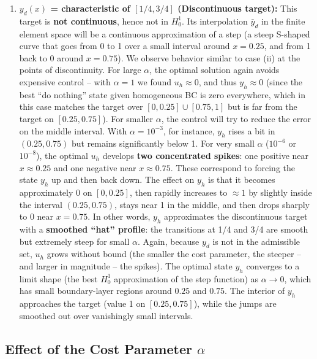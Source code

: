 \documentclass[a4paper,10pt]{report}
\begin{document}
\begin{enumerate}
	\item \textbf{\(y_d(x)\) = characteristic of \([1/4,3/4]\) (Discontinuous target):} This target is \textbf{not continuous}, hence not in \(H^1_0\). Its interpolation \(\bar y_d\) in the finite element space will be a continuous approximation of a step (a steep S-shaped curve that goes from 0 to 1 over a small interval around \(x=0.25\), and from 1 back to 0 around \(x=0.75\)). We observe behavior similar to case (ii) at the points of discontinuity. For large \(\alpha\), the optimal solution again avoids expensive control – with \(\alpha=1\) we found \(u_h\approx 0\), and thus \(y_h\approx 0\) (since the best “do nothing” state given homogeneous BC is zero everywhere, which in this case matches the target over \([0,0.25]\cup[0.75,1]\) but is far from the target on \([0.25,0.75]\)). For smaller \(\alpha\), the control will try to reduce the error on the middle interval. With \(\alpha=10^{-3}\), for instance, \(y_h\) rises a bit in \((0.25,0.75)\) but remains significantly below 1. For very small \(\alpha\) (\(10^{-6}\) or \(10^{-8}\)), the optimal \(u_h\) develops \textbf{two concentrated spikes}: one positive near \(x\approx 0.25\) and one negative near \(x\approx 0.75\). These correspond to forcing the state \(y_h\) up and then back down. The effect on \(y_h\) is that it becomes approximately 0 on \([0,0.25]\), then rapidly increases to \(\approx 1\) by slightly inside the interval \((0.25,0.75)\), stays near 1 in the middle, and then drops sharply to 0 near \(x=0.75\). In other words, \(y_h\) approximates the discontinuous target with a \textbf{smoothed “hat” profile}: the transitions at 1/4 and 3/4 are smooth but extremely steep for small \(\alpha\). Again, because \(y_d\) is not in the admissible set, \(u_h\) grows without bound (the smaller the cost parameter, the steeper – and larger in magnitude – the spikes). The optimal state \(y_h\) converges to a limit shape (the best \(H^1_0\) approximation of the step function) as \(\alpha\to 0\), which has small boundary-layer regions around \(0.25\) and \(0.75\). The interior of \(y_h\) approaches the target (value 1 on \([0.25,0.75]\)), while the jumps are smoothed out over vanishingly small intervals.
\end{enumerate}

\subsection{Effect of the Cost Parameter \texorpdfstring{\(\alpha\)}{alpha}}
\end{document}
